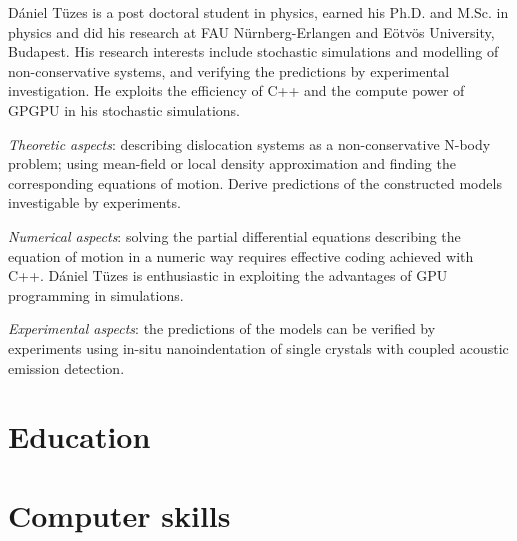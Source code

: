 \documentclass[11pt,a4paper,sans]{moderncv}        %
\begin{document}
\makecvtitle
Dániel Tüzes is a post doctoral student in physics, earned his Ph.D. and M.Sc. in physics and did his research at FAU Nürnberg-Erlangen and Eötvös University, Budapest. His research interests include stochastic simulations and modelling of non-conservative systems, and verifying the predictions by experimental investigation. He exploits the efficiency of C++ and the compute power of GPGPU in his stochastic simulations.\vspace{0.5em}

\textit{Theoretic aspects}: describing dislocation systems as a non-conservative N-body problem; using mean-field or local density approximation and finding the corresponding equations of motion. Derive predictions of the constructed models investigable by experiments.\vspace{0.5em}

\textit{Numerical aspects}: solving the partial differential equations describing the equation of motion in a numeric way requires effective coding achieved with C++. Dániel Tüzes is enthusiastic in exploiting the advantages of GPU programming in simulations.\vspace{0.5em}

\textit{Experimental aspects}: the predictions of the models can be verified by experiments using in-situ nanoindentation of single crystals with coupled acoustic emission detection.

\section{Education}

\section{Computer skills}
\end{document}
